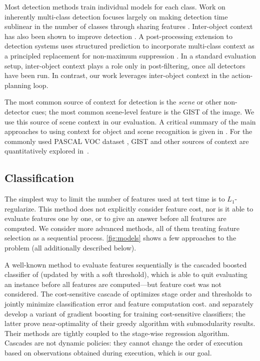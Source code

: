 Most detection methods train individual models for each class.
Work on inherently multi-class detection focuses largely on making detection time sublinear in the number of classes through sharing features \parencite{Torralba2007,Fan2005}.
Inter-object context has also been shown to improve detection \parencite{Torralba2004}.
A post-processing extension to detection systems uses structured prediction to incorporate multi-class context as a principled replacement for non-maximum suppression \parencite{Desai2009}.
In a standard evaluation setup, inter-object context plays a role only in post-filtering, once all detectors have been run.
In contrast, our work leverages inter-object context in the action-planning loop.

The most common source of context for detection is the \emph{scene} or other non-detector cues; the most common scene-level feature is the GIST \parencite{Oliva-IJCV-2001} of the image.
We use this source of scene context in our evaluation.
A critical summary of the main approaches to using context for object and scene recognition is given in \parencite{Galleguillos2010}.
For the commonly used PASCAL VOC dataset \parencite{pascal-voc-2010}, GIST and other sources of context are quantitatively explored in~\parencite{Divvala2009}.

\subsection{Classification}



The simplest way to limit the number of features used at test time is to $L_1$-regularize.
This method does not explicitly consider feature cost, nor is it able to evaluate features one by one, or to give an answer before all features are computed.
We consider more advanced methods, all of them treating feature selection as a sequential process.
\autoref{fig:models} shows a few approaches to the problem (all additionally described below).

A well-known method to evaluate features sequentially is the cascaded boosted classifier of \cite{Viola2004} (updated by \cite{Bourdev-CVPR-2005} with a soft threshold), which is able to quit evaluating an instance before all features are computed---but feature cost was not considered.
The cost-sensitive cascade of \cite{Chen-AISTATS-2012} optimizes stage order and thresholds to jointly minimize classification error and feature computation cost.
\cite{Xu-ICML-2012} and \cite{Grubb-AISTATS-2012} separately develop a variant of gradient boosting for training cost-sensitive classifiers; the latter prove near-optimality of their greedy algorithm with submodularity results.
Their methods are tightly coupled to the stage-wise regression algorithm.
Cascades are not dynamic policies: they cannot change the order of execution based on observations obtained during execution, which is our goal.


